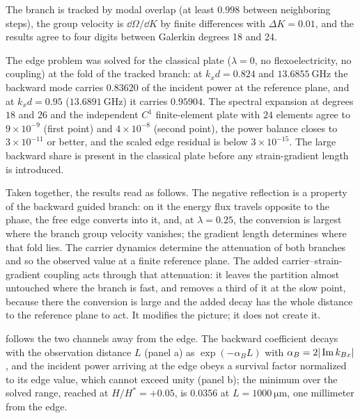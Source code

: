 The branch is tracked by modal overlap (at least $0.998$ between neighboring steps), the group velocity is $\dd\Omega/\dd K$ by finite differences with $\Delta K=0.01$, and the results agree to four digits between Galerkin degrees 18 and 24.


The edge problem was solved for the classical plate ($\lambda=0$, no flexoelectricity, no
coupling) at the fold of the tracked branch: at $k_xd=0.824$ and
$\SI{13.6855}{\giga\hertz}$ the backward mode carries $0.83620$ of the incident power at the
reference plane, and at $k_xd=0.95$ ($\SI{13.6891}{\giga\hertz}$) it carries $0.95904$.  The spectral
expansion at degrees $18$ and $26$ and the independent $C^{1}$ finite-element plate with $24$
elements agree to $9\times10^{-9}$ (first point) and $4\times10^{-8}$ (second point), the power
balance closes to $3\times10^{-11}$ or better, and the scaled edge residual is below
$3\times10^{-15}$.  The large backward share is present in the classical plate before any
strain-gradient length is introduced.

Taken together, the results read as follows.  The negative
reflection is a property of the backward guided branch: on it the energy flux
travels opposite to the phase, the free edge converts into it, and, at $\lambda=0.25$, the conversion
is largest where the branch group velocity vanishes; the gradient length
determines where that fold lies.  The carrier dynamics determine the attenuation
of both branches and so the observed value at a finite reference plane.
The added carrier--strain-gradient coupling acts through that attenuation: it
leaves the partition almost untouched where the branch is fast, and removes a
third of it at the slow point, because there the conversion is large and the
added decay has the whole distance to the reference plane to act.  It modifies
the picture; it does not create it.


 follows the two channels away from the edge.  The backward
coefficient decays with the observation distance $L$ (panel a) as
$\exp(-\alpha_B L)$ with $\alpha_B=2|\operatorname{Im} k_{Bx}|$, and the incident power
arriving at the edge obeys a survival factor normalized to its edge value, which cannot exceed unity (panel b); the minimum over the solved range, reached at $H/H^{*}=+0.05$, is
$0.0356$ at $L=\SI{1000}{\micro\metre}$, one millimeter from the edge.


